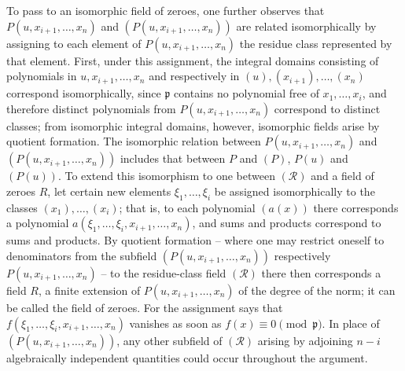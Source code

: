 \documentclass[11pt]{article}
\providecommand{\frakp}{\mathfrak p}
\begin{document}
To pass to an isomorphic field of zeroes, one further observes that $P(u,x_{i+1},\ldots,x_n)$ and $(P(u,x_{i+1},\ldots,x_n))$ are related isomorphically by assigning to each element of $P(u,x_{i+1},\ldots,x_n)$ the residue class represented by that element. First, under this assignment, the integral domains consisting of polynomials in $u,x_{i+1},\ldots,x_n$ and respectively in $(u),(x_{i+1}),\ldots,(x_n)$ correspond isomorphically, since $\frakp$ contains no polynomial free of $x_1,\ldots,x_i$, and therefore distinct polynomials from $P(u,x_{i+1},\ldots,x_n)$ correspond to distinct classes; from isomorphic integral domains, however, isomorphic fields arise by quotient formation. The isomorphic relation between $P(u,x_{i+1},\ldots,x_n)$ and $(P(u,x_{i+1},\ldots,x_n))$ includes that between $P$ and $(P)$, $P(u)$ and $(P(u))$. To extend this isomorphism to one between $(\mathcal R)$ and a field of zeroes $R$, let certain new elements $\xi_1,\ldots,\xi_i$ be assigned isomorphically to the classes $(x_1),\ldots,(x_i)$; that is, to each polynomial $(a(x))$ there corresponds a polynomial $a(\xi_1,\ldots,\xi_i,x_{i+1},\ldots,x_n)$, and sums and products correspond to sums and products. By quotient formation -- where one may restrict oneself to denominators from the subfield $(P(u,x_{i+1},\ldots,x_n))$ respectively $P(u,x_{i+1},\ldots,x_n)$ -- to the residue-class field $(\mathcal R)$ there then corresponds a field $R$, a finite extension of $P(u,x_{i+1},\ldots,x_n)$ of the degree of the norm; it can be called the field of zeroes. For the assignment says that $f(\xi_1,\ldots,\xi_i,x_{i+1},\ldots,x_n)$ vanishes as soon as $f(x)\equiv0\pmod{\frakp}$. In place of $(P(u,x_{i+1},\ldots,x_n))$, any other subfield of $(\mathcal R)$ arising by adjoining $n-i$ algebraically independent quantities could occur throughout the argument.
\end{document}
